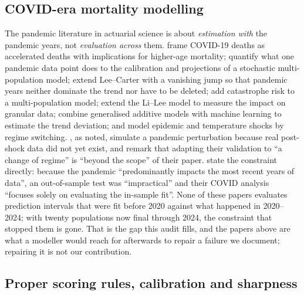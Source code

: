 \subsection{COVID-era mortality modelling}

The pandemic literature in actuarial science is about \emph{estimation with}
the pandemic years, not \emph{evaluation across} them.
\citet{cairns2020impact} frame COVID-19 deaths as accelerated deaths with
implications for higher-age mortality; \citet{robben2022assessing} quantify
what one pandemic data point does to the calibration and projections of a
stochastic multi-population model; \citet{goes2025bayesian} extend
Lee--Carter with a vanishing jump so that pandemic years neither dominate the
trend nor have to be deleted; \citet{robben2024catastrophe} add catastrophe
risk to a multi-population model; \citet{vanberkum2025estimating} extend the
Li--Lee model to measure the impact on granular data;
\citet{nalmpatian2023advanced} combine generalised additive models with
machine learning to estimate the trend deviation; and
\citet{robben2025granular} model epidemic and temperature shocks by regime
switching. \citet{barigou2023bayesian}, as noted, simulate a pandemic
perturbation because real post-shock data did not yet exist, and remark
that adapting their validation to ``a change of regime'' is ``beyond the
scope'' of their paper. \citet{goes2025bayesian} state the constraint
directly: because the pandemic ``predominantly impacts the most recent
years of data'', an out-of-sample test was ``impractical'' and their COVID
analysis ``focuses solely on evaluating the in-sample fit''. None of these
papers evaluates prediction intervals that were fit before 2020 against
what happened in 2020--2024; with twenty populations now final through
2024, the constraint that stopped them is gone. That is the gap this audit
fills, and the papers above are what a modeller would reach for afterwards
to repair a failure we document; repairing it is not our contribution.

\subsection{Proper scoring rules, calibration and sharpness}

